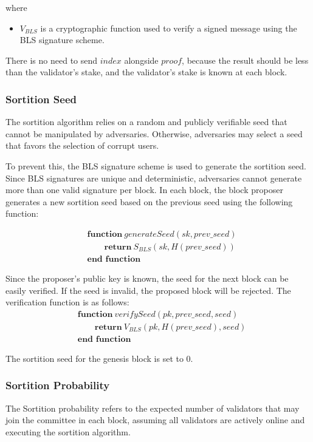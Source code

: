 \documentclass{novel}
\begin{document}
where
\begin{itemize}
  \item  $V_{BLS}$ is a cryptographic function used to verify a signed message using the BLS signature scheme.
\end{itemize}
There is no need to send $index$ alongside $proof$, because the result should be less than the validator’s stake, and the validator’s stake is known at each block.

\subsubsection{Sortition Seed}
The sortition algorithm relies on a random and publicly verifiable seed that cannot be manipulated by adversaries. Otherwise, adversaries may select a seed that favors the selection of corrupt users.

To prevent this, the BLS signature scheme is used to generate the sortition seed. Since BLS signatures are unique and deterministic, adversaries cannot generate more than one valid signature per block. In each block, the block proposer generates a new sortition seed based on the previous seed using the following function:

  \begin{align*}
& \textbf{function} \ generateSeed(sk, prev\_seed) \\
& \qquad \textbf{return} \ S_{BLS}(sk, H(prev\_seed)) \\
& \textbf{end function}
\end{align*}

Since the proposer’s public key is known, the seed for the next block can be easily verified. If the seed is invalid, the proposed block will be rejected. The verification function is as follows:
  \begin{align*}
& \textbf{function} \ verifySeed(pk, prev\_seed, seed) \\
& \qquad \textbf{return} \ V_{BLS}(pk, H(prev\_seed), seed) \\
& \textbf{end function}
\end{align*}

The sortition seed for the genesis block is set to $0$.

\subsubsection{Sortition Probability}
The Sortition probability refers to the expected number of validators that may join the committee in each block, assuming all validators are actively online and executing the sortition algorithm.
\end{document}
